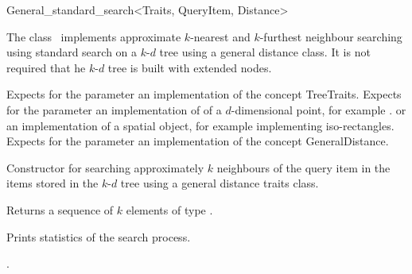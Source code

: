 

\begin{ccRefClass}{General_standard_search<Traits, QueryItem, Distance>}  %


\ccDefinition
  
The class \ccRefName\ implements approximate $k$-nearest and $k$-furthest neighbour searching
using standard search on a $k$-$d$ tree using a general distance 
class. It is not required that he $k$-$d$ tree is built with extended nodes.


\ccParameters

Expects for the parameter  an implementation of the concept TreeTraits.
Expects for the parameter   an implementation of
of a $d$-dimensional point, for example .
or an implementation of a spatial object, for
example  implementing iso-rectangles.
Expects for the parameter  an implementation of the
concept GeneralDistance.

\ccTypes



\ccCreation
{}  %

{Constructor for searching approximately $k$ neighbours of the query item  
in the items stored in the $k$-$d$ tree  using a general distance
traits class.} 


{Returns a sequence of $k$ elements of type }. 

{
Prints statistics of the search process.
}

\ccSeeAlso

.

\end{ccRefClass}



